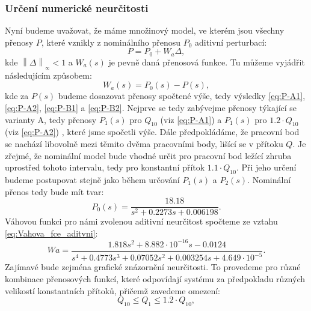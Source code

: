 \documentclass[a4paper,11pt]{article}
\begin{document}
\subsubsection{Určení numerické neurčitosti}
Nyní budeme uvažovat, že máme množinový model, ve kterém jsou všechny přenosy $ P $, které vznikly z nominálního přenosu $ P_{0} $ aditivní perturbací:
\begin{equation}\label{eq:Aditivni_neurcitost-zakladni_vztah} 
P = P_{0}+W_{a}\Delta,
\end{equation}
kde $ \left\| \Delta   \right \|_{_{\infty }}< 1 $ a $ W_{a}\left ( s \right ) $ je pevně daná přenosová funkce. Tu můžeme vyjádřit následujícím způsobem:
\begin{equation}\label{eq:Vahova_fce_aditvni} 
W_{a}\left ( s \right ) = P_{0}\left ( s \right )-P\left ( s \right ),
\end{equation}
kde za $ P\left ( s \right ) $ budeme dosazovat přenosy spočtené výše, tedy výsledky \ref{eq:P-A1}, \ref{eq:P-A2}, \ref{eq:P-B1} a \ref{eq:P-B2}. Nejprve se tedy zabývejme přenosy týkající se varianty A, tedy přenosy $ P_{1}\left ( s \right ) $ pro $ Q_{10} $ (viz \ref{eq:P-A1}) a $ P_{1}\left ( s \right ) $ pro $ 1.2\cdot Q_{10} $ (viz \ref{eq:P-A2}) , které jsme spočetli výše. Dále předpokládáme, že pracovní bod se nachází libovolně mezi těmito dvěma pracovními body, lišící se v přítoku $ Q $. Je zřejmé, že nominální model bude vhodné určit pro pracovní bod ležící zhruba uprostřed tohoto intervalu, tedy pro konstantní přítok $ 1.1\cdot Q_{10} $. Při jeho určení budeme postupovat stejně jako během určování $ P_{1}\left ( s \right ) $ a $ P_{2}\left ( s \right ) $. Nominální přenos tedy bude mít tvar:
\begin{equation}\label{eq:P-A0} 
P_{0}\left ( s \right ) =\frac{18.18}{s^{2} + 0.2273 s + 0.006198}.
\end{equation}
Váhovou funkci pro námi zvolenou aditivní neurčitost spočteme ze vztahu \ref{eq:Vahova_fce_aditvni}:   
\begin{equation}\label{eq:Wa-A}
Wa = \frac{1.818 s^{2} + 8.882\cdot 10^{-16}s - 0.0124}{s^{4} + 0.4773 s^{3} + 0.07052 s^{2} + 0.003254 s + 4.649\cdot 10^{-5}}.
\end{equation} 
Zajímavé bude zejména grafické znázornění neurčitosti. To provedeme pro různé kombinace přenosových funkcí, které odpovídají systému za předpokladu různých velikostí konstantních přítoků, přičemž zavedeme omezení: 
\begin{equation}
\label{eq:Q_omezeni} 
Q_{10} \leq Q_{1} \leq 1.2\cdot Q_{10}, 
\end{equation}
\end{document}
